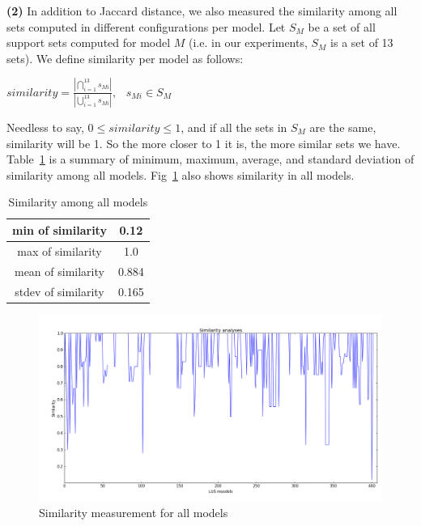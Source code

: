 \noindent{}
 \vspace{9pt}
 
\textbf{(2)} In addition to Jaccard distance, we also measured the similarity among all sets computed in different configurations per model. Let $S_M$ be a set of all support sets computed for model $M$ (i.e. in our experiments, $S_M$ is a set of 13 sets).  We define similarity per model as follows:

\begin{center}
$similarity = \frac{|\bigcap_{i=1}^{13} s_{Mi}|}{|\bigcup_{i=1}^{13} s_{Mi}|}, \hspace{9pt} s_{Mi} \in S_M$
\end{center}
\vspace{6pt} 

Needless to say, $0 \leq similarity \leq 1$, and if all the sets in $S_M$ are the same, similarity will be 1. So the more closer to 1 it is, the more similar sets we have. Table~\ref{tab:sim} is a summary of minimum, maximum, average, and standard deviation of similarity among all models. Fig~\ref{fig:sim} also shows similarity in all models.

\begin{table}
  \centering
  \begin{tabular}{ |c|c|}
    \hline
     min of similarity& 0.12 \\[0.5ex]
     \hline
     max of similarity& 1.0\\[0.5ex]
     \hline
     mean of similarity & 0.884\\[0.5ex]
     \hline
     stdev of similarity & 0.165\\[0.5ex]
    \hline
  \end{tabular}
  \caption{\small{Similarity among all models}}
  \label{tab:sim}
\end{table}

\begin{figure}
  \centering
  \includegraphics[width=\textwidth]{figs/similarity.png}
  \caption{Similarity measurement for all models}\label{fig:sim}
\end{figure}

